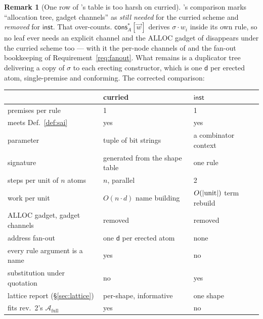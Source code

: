 \documentclass[11pt,a4paper]{article}
\newcommand{\dd}{\mathsf{d}}
\newcommand{\cons}{\mathsf{cons}}
\newcommand{\Atm}{\mathcal{A}}
\newcommand{\ALLOC}{\mathrm{ALLOC}}
\newcommand{\inst}{\mathsf{inst}}
\theoremstyle{definition}
\newtheorem{remark}[definition]{Remark}
\theoremstyle{plain}
\begin{document}
\begin{remark}[One row of \cite{draft3}'s table is too harsh on curried]
\label{rem:tablerow}
\cite[\S6.7]{draft3}'s comparison marks ``allocation tree, gadget channels''
as \emph{still needed} for the curried scheme and \emph{removed} for $\inst$.
That over-counts. $\cons^{*}_{A}[\vec w]$ derives $\sigma\!\cdot\!w_{i}$
inside its own rule, so no leaf ever needs an explicit channel and the
$\ALLOC$ gadget of \cite[Def.~6.6]{draft3} disappears under the curried scheme
too --- with it the per-node channels of \cite[Rem.~6.13]{draft3} and the
fan-out bookkeeping of Requirement~\ref{req:fanout}. What remains is a
duplicator tree delivering a copy of $\sigma$ to each erecting constructor,
which is one $\dd$ per erected atom, single-premise and conforming. The
corrected comparison:
\end{remark}

\begin{center}
\footnotesize
\begin{tabular}{@{}lll@{}}
\toprule
 & curried & $\inst$\\
\midrule
premises per rule & 1 & 1\\
meets Def.~\ref{def:sai} & yes & yes\\
parameter & tuple of bit strings & a combinator context\\
signature & generated from the shape table & one rule\\
steps per unit of $n$ atoms & $n$, parallel & 2\\
work per unit & $O(n\cdot d)$ name building & $O(|{\rm unit}|)$ term rebuild\\
$\ALLOC$ gadget, gadget channels & removed & removed\\
address fan-out & one $\dd$ per erected atom & none\\
every rule argument is a name & yes & no\\
substitution under quotation & no & yes\\
lattice report (\S\ref{sec:lattice}) & per-shape, informative & one shape\\
fits \cite{logic} rev.~2's $\Atm_{\mathrm{full}}$ & yes & no\\
\bottomrule
\end{tabular}
\end{center}
\end{document}
